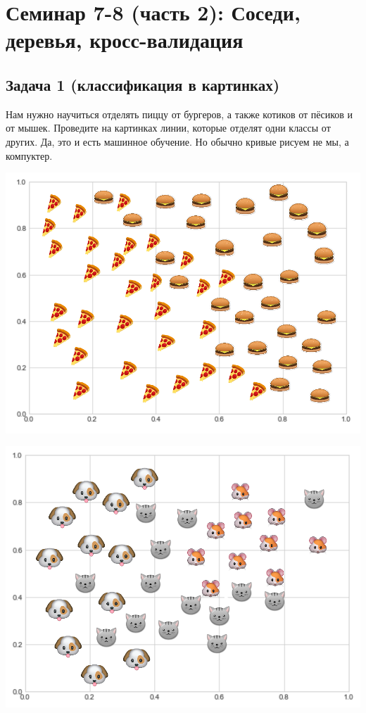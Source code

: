 \documentclass[12pt, a4paper, oneside]{article}
\theoremstyle{plain} %
\theoremstyle{definition}
\begin{document}

\toggletrue{lecture}


	
\section*{Семинар 7-8 (часть 2):  Соседи, деревья, кросс-валидация}

\subsection*{Задача 1 (классификация в картинках)}

Нам нужно научиться отделять пиццу от бургеров, а также котиков от пёсиков и от мышек. Проведите на картинках линии, которые отделят одни классы от других.  Да, это и есть машинное обучение. Но обычно кривые рисуем не мы, а компуктер.

\begin{minipage}[t]{0.45\textwidth}
	\includegraphics[scale=0.21]{class_1.png}
\end{minipage}
\hfill
\begin{minipage}[t]{0.45\textwidth}
	\includegraphics[scale=0.21]{class_2.png}
\end{minipage}
\end{document}

